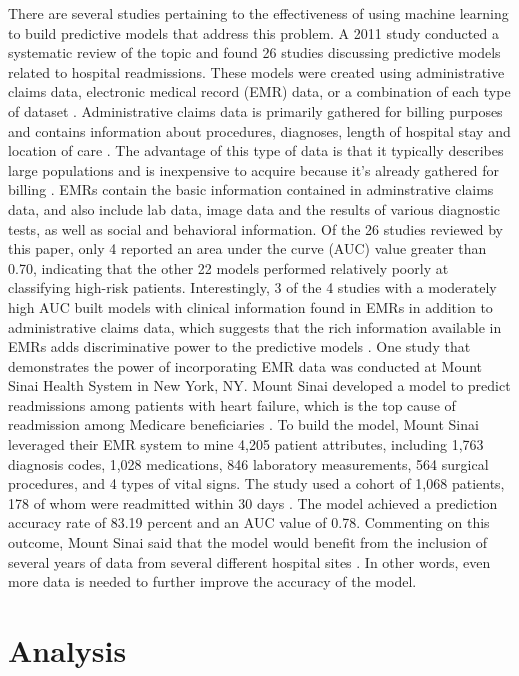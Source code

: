 \documentclass[sigconf]{acmart}
\begin{document}
There are several studies pertaining to the effectiveness of using machine learning to build predictive models that address this problem. A 2011 study conducted a systematic review of the topic and found 26 studies discussing predictive models related to hospital readmissions. These models were created using administrative claims data, electronic medical record (EMR) data, or a combination of each type of dataset \cite{cite08}. Administrative claims data is primarily gathered for billing purposes and contains information about procedures, diagnoses, length of hospital stay and location of care \cite{cite10}. The advantage of this type of data is that it typically describes large populations and is inexpensive to acquire because it's already gathered for billing \cite{cite05}. EMRs contain the basic information contained in adminstrative claims data, and also include lab data, image data and the results of various diagnostic tests, as well as social and behavioral information. Of the 26 studies reviewed by this paper, only 4 reported an area under the curve (AUC) value greater than 0.70, indicating that the other 22 models performed relatively poorly at classifying high-risk patients. Interestingly, 3 of the 4 studies with a moderately high AUC built models with clinical information found in EMRs in addition to administrative claims data, which suggests that the rich information available in EMRs adds discriminative power to the predictive models \cite{cite05}.
One study that demonstrates the power of incorporating EMR data was conducted at Mount Sinai Health System in New York, NY. Mount Sinai developed a model to predict readmissions among patients with heart failure, which is the top cause of readmission among Medicare beneficiaries \cite{cite01}. To build the model, Mount Sinai leveraged their EMR system to mine 4,205 patient attributes, including 1,763 diagnosis codes, 1,028 medications, 846 laboratory measurements, 564 surgical procedures, and 4 types of vital signs. The study used a cohort of 1,068 patients, 178 of whom were readmitted within 30 days \cite{cite01}. The model achieved a prediction accuracy rate of 83.19 percent and an AUC value of 0.78. Commenting on this outcome, Mount Sinai said that the model would benefit from the inclusion of several years of data from several different hospital sites \cite{cite01}. In other words, even more data is needed to further improve the accuracy of the model.

\section{Analysis}
\end{document}

